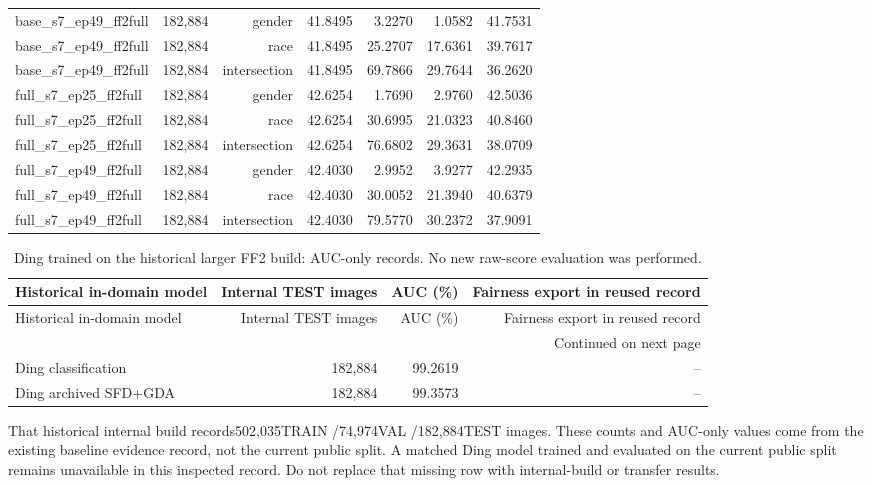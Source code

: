 \documentclass[10pt]{article}
\begin{document}
\begin{longtable}{@{}lrrrrrr@{}}
base\_s7\_ep49\_ff2full & 182,884 & gender & 41.8495 & 3.2270 & 1.0582 & 41.7531 \\
base\_s7\_ep49\_ff2full & 182,884 & race & 41.8495 & 25.2707 & 17.6361 & 39.7617 \\
base\_s7\_ep49\_ff2full & 182,884 & intersection & 41.8495 & 69.7866 & 29.7644 & 36.2620 \\
full\_s7\_ep25\_ff2full & 182,884 & gender & 42.6254 & 1.7690 & 2.9760 & 42.5036 \\
full\_s7\_ep25\_ff2full & 182,884 & race & 42.6254 & 30.6995 & 21.0323 & 40.8460 \\
full\_s7\_ep25\_ff2full & 182,884 & intersection & 42.6254 & 76.6802 & 29.3631 & 38.0709 \\
full\_s7\_ep49\_ff2full & 182,884 & gender & 42.4030 & 2.9952 & 3.9277 & 42.2935 \\
full\_s7\_ep49\_ff2full & 182,884 & race & 42.4030 & 30.0052 & 21.3940 & 40.6379 \\
full\_s7\_ep49\_ff2full & 182,884 & intersection & 42.4030 & 79.5770 & 30.2372 & 37.9091 \\
\end{longtable}

\begin{longtable}{@{}lrrr@{}}
\caption{Ding trained on the historical larger FF2 build: AUC-only records. No new raw-score evaluation was performed.}\\
\toprule
Historical in-domain model & Internal TEST images & AUC (\%) & Fairness export in reused record \\
\midrule
\endfirsthead
\toprule
Historical in-domain model & Internal TEST images & AUC (\%) & Fairness export in reused record \\
\midrule
\endhead
\midrule
\multicolumn{4}{r}{Continued on next page}\\
\endfoot
\bottomrule
\endlastfoot
Ding classification & 182,884 & 99.2619 & -- \\
Ding archived SFD+GDA & 182,884 & 99.3573 & -- \\
\end{longtable}

That historical internal build records502,035TRAIN /74,974VAL /182,884TEST images. These counts and AUC-only values come from the existing baseline evidence record, not the current public split. A matched Ding model trained and evaluated on the current public split remains unavailable in this inspected record. Do not replace that missing row with internal-build or transfer results.
\end{document}
